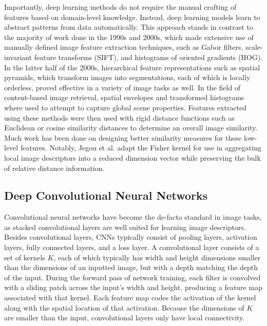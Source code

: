 Importantly, deep learning methods do not require the manual crafting of features based on domain-level knowledge. Instead, deep learning models learn to abstract patterns from data automatically. This approach stands in contrast to the majority of work done in the 1990s and 2000s, which made extensive use of manually defined image feature extraction techniques, such as Gabor filters, scale-invariant feature transforms (SIFT), and histograms of oriented gradients (HOG).\cite{jain1997object}\cite{lowe1999object}\cite{dalal2005histograms} In the latter half of the 2000s, hierarchical feature representations such as spatial pyramids, which transform images into segmentations, each of which is locally orderless, proved effective in a variety of image tasks as well\cite{yang2009linear}\cite{girshick2014rich}\cite{lazebnik2006beyond}. In the field of content-based image retrieval, spatial envelopes and transformed histograms where used to attempt to capture global scene properties\cite{oliva2001modeling}\cite{wu2011centrist}. Features extracted using these methods were then used with rigid distance functions such as Euclidean or cosine similarity distances to determine an overall image similarity. Much work has been done on designing better similarity measures for these low-level features. Notably, Jegou et al.\cite{jegou2012aggregating} adapt the Fisher kernel for use in aggregating local image descriptors into a reduced dimension vector while preserving the bulk of relative distance information. 

\subsection{Deep Convolutional Neural Networks}
Convolutional neural networks have become the de-facto standard in image tasks, as stacked convolutional layers are well suited for learning image descriptors.\cite{karpathy2014large}\cite{krizhevsky2012imagenet}\cite{szegedy2015going} Besides convolutional layers, CNNs typically consist of pooling layers, activation layers, fully connected layers, and a loss layer. A convolutional layer consists of a set of kernels $K$, each of which typically has width and height dimensions smaller than the dimensions of an inputted image, but with a depth matching the depth of the input. During the forward pass of network training, each filter is convolved with a sliding patch across the input's width and height, producing a feature map associated with that kernel. Each feature map codes the activation of the kernel along with the spatial location of that activation. Because the dimensions of $K$ are smaller than the input, convolutional layers only have local connectivity.

